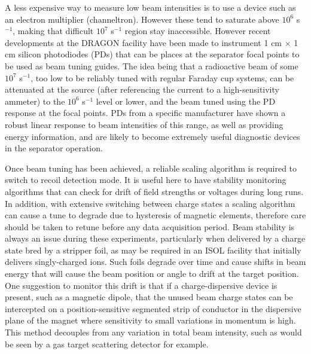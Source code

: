 A less expensive way to measure low beam intensities is to use a device such as an electron multiplier (channeltron). However these tend to saturate above $10^{6}$ s$^{-1}$, making that difficult $10^{7}$ s$^{-1}$ region stay inaccessible. However recent developments at the DRAGON facility \cite{chr14} have been made to instrument 1 cm $\times$ 1 cm silicon photodiodes (PDs) that can be places at the separator focal points to be used as beam tuning guides. The idea being that a radioactive beam of some $10^{7}$ s$^{-1}$, too low to be reliably tuned with regular Faraday cup systems, can be attenuated at the source (after referencing the current to a high-sensitivity ammeter) to the $10^{6}$ s$^{-1}$ level or lower, and the beam tuned using the PD response at the focal points. PDs from a specific manufacturer have shown a robust linear response to beam intensities of this range, as well as providing energy information, and are likely to become extremely useful diagnostic devices in the separator operation.  

Once beam tuning has been achieved, a reliable scaling algorithm is required to switch to recoil detection mode. It is useful here to have stability monitoring algorithms that can check for drift of field strengths or voltages during long runs. In addition, with extensive switching between charge states a scaling algorithm can cause a tune to degrade due to hysteresis of magnetic elements, therefore care should be taken to retune before any data acquisition period. Beam stability is always an issue during these experiments, particularly when delivered by a charge state bred by a stripper foil, as may be required in an ISOL facility that initially delivers singly-charged ions. Such foils degrade over time and cause shifts in beam energy that will cause the beam position or angle to drift at the target position. One suggestion to monitor this drift is that if a charge-dispersive device is present, such as a magnetic dipole, that the unused beam charge states can be intercepted on a position-sensitive segmented strip of conductor in the dispersive plane of the magnet where sensitivity to small variations in momentum is high. This method decouples from any variation in total beam intensity, such as would be seen by a gas target scattering detector for example.

